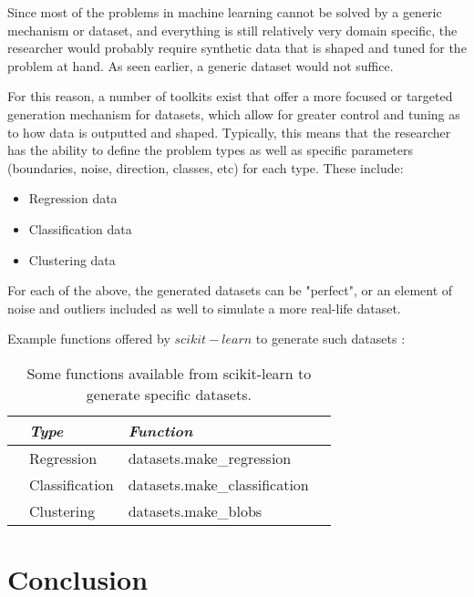 Since most of the problems in machine learning cannot be solved by a generic mechanism or dataset, and everything is still relatively very domain specific, the researcher would probably require synthetic data that is shaped and tuned for the problem at hand. As seen earlier, a generic dataset would not suffice.

For this reason, a number of toolkits exist that offer a more focused or targeted generation mechanism for datasets, which allow for greater control and tuning as to how data is outputted and shaped. Typically, this means that the researcher has the ability to define the problem types as well as specific parameters (boundaries, noise, direction, classes, etc) for each type. These include:

\begin{itemize}
    \item Regression data
    \item Classification data
    \item Clustering data
\end{itemize}

For each of the above, the generated datasets can be "perfect", or an element of noise and outliers included as well to simulate a more real-life dataset.

Example functions offered by $scikit-learn$ to generate such datasets \citep{Sarkar2018}:

\begin{table}[ht]
    \centering
    \selectfont
    \begin{tabular}{llll}
      \toprule
                        & \textit{Type} & \textit{Function} \\
      \midrule
      \textit & Regression              & datasets.make\_regression \\
      \textit & Classification          & datasets.make\_classification  \\
      \textit & Clustering              & datasets.make\_blobs  \\
      \bottomrule
    \end{tabular}
    \caption{Some functions available from scikit-learn to generate specific datasets.}
    \label{tab:sf_scikitdatagen}
\end{table}
\vspace{2mm}

\section{Conclusion}

